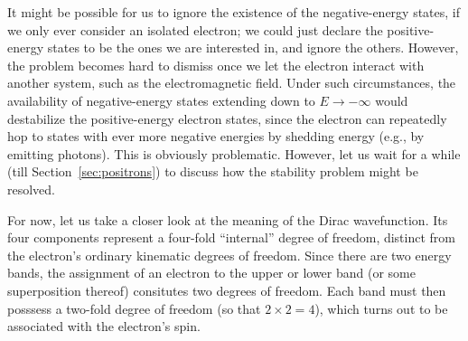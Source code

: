 \documentclass[pra,12pt]{revtex4}
\begin{document}
It might be possible for us to ignore the existence of the
negative-energy states, if we only ever consider an isolated electron;
we could just declare the positive-energy states to be the ones we are
interested in, and ignore the others.  However, the problem becomes
hard to dismiss once we let the electron interact with another system,
such as the electromagnetic field.  Under such circumstances, the
availability of negative-energy states extending down to $E\rightarrow
-\infty$ would destabilize the positive-energy electron states, since
the electron can repeatedly hop to states with ever more negative
energies by shedding energy (e.g., by emitting photons).  This is
obviously problematic.  However, let us wait for a while (till
Section~\ref{sec:positrons}) to discuss how the stability problem
might be resolved.

For now, let us take a closer look at the meaning of the Dirac
wavefunction.  Its four components represent a four-fold ``internal''
degree of freedom, distinct from the electron's ordinary kinematic
degrees of freedom.  Since there are two energy bands, the assignment
of an electron to the upper or lower band (or some superposition
thereof) consitutes two degrees of freedom.  Each band must then
posssess a two-fold degree of freedom (so that $2\times 2 = 4$), which
turns out to be associated with the electron's spin.
\end{document}
